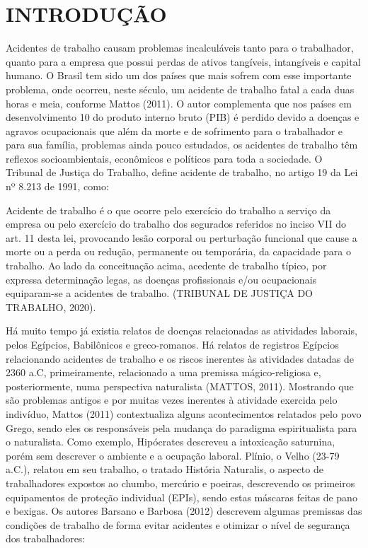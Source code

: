 
\chapter{INTRODUÇÃO}
\label{chap:introducao}

Acidentes de trabalho causam problemas incalculáveis tanto para o trabalhador, quanto para a empresa que possui perdas de ativos tangíveis, intangíveis e capital humano. O Brasil tem sido um dos países que mais sofrem com esse importante problema, onde ocorreu, neste século, um acidente de trabalho fatal a cada duas horas e meia, conforme Mattos (2011).  O autor complementa que nos países em desenvolvimento 10 do produto interno bruto (PIB) é perdido devido a doenças e agravos ocupacionais que além da morte e de sofrimento para o trabalhador e para sua família, problemas ainda pouco estudados, os acidentes de trabalho têm reflexos socioambientais, econômicos e políticos para toda a sociedade.
O Tribunal de Justiça do Trabalho, define acidente de trabalho, no artigo 19 da Lei nº 8.213 de 1991, como:

\begin{citacao}
Acidente de trabalho é o que ocorre pelo exercício do trabalho a serviço da empresa ou pelo exercício do trabalho dos segurados referidos no inciso VII do art. 11 desta lei, provocando lesão corporal ou perturbação funcional que cause a morte ou a perda ou redução, permanente ou temporária, da capacidade para o trabalho. Ao lado da conceituação acima, acedente de trabalho típico, por expressa determinação legas, as doenças profissionais e/ou ocupacionais equiparam-se a acidentes de trabalho. (TRIBUNAL DE JUSTIÇA DO TRABALHO, 2020). 
\end{citacao}

Há muito tempo já existia relatos de doenças relacionadas as atividades laborais, pelos Egípcios, Babilônicos e greco-romanos. Há relatos de registros Egípcios relacionando acidentes de trabalho e os riscos inerentes às atividades datadas de 2360 a.C, primeiramente, relacionado a uma premissa mágico-religiosa e, posteriormente, numa perspectiva naturalista (MATTOS, 2011).
Mostrando que são problemas antigos e por muitas vezes inerentes à atividade exercida pelo indivíduo, Mattos (2011) contextualiza alguns acontecimentos relatados pelo povo Grego, sendo eles os responsáveis pela mudança do paradigma espiritualista para o naturalista. Como exemplo, Hipócrates descreveu a intoxicação saturnina, porém sem descrever o ambiente e a ocupação laboral. Plínio, o Velho (23-79 a.C.), relatou em seu trabalho, o tratado História Naturalis, o aspecto de trabalhadores expostos ao chumbo, mercúrio e poeiras, descrevendo os primeiros equipamentos de proteção individual (EPIs), sendo estas máscaras feitas de pano e bexigas.
Os autores Barsano e Barbosa (2012) descrevem algumas premissas das condições de trabalho de forma evitar acidentes e otimizar o nível de segurança dos trabalhadores:

